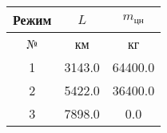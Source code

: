 \begin{tabular}{|c|c|c|}
\hline
Режим & $L$ & $m_{цн}$ \\ 
\hline
№ & км & кг \\ 
\hline
1 & 3143.0 & 64400.0 \\ 
\hline
2 & 5422.0 & 36400.0 \\ 
\hline
3 & 7898.0 & 0.0 \\ 
\hline
\end{tabular}